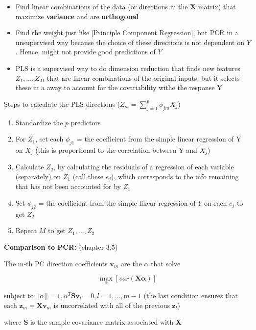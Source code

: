 \documentclass[
]{book}
\begin{document}
\begin{itemize}
\item
  Find linear combinations of the data (or directions in the \(\mathbf{X}\) matrix) that maximize \textbf{variance} and are \textbf{orthogonal}
\item
  Find the weight just like {[}Principle Component Regression{]}, but PCR in a unsupervised way because the choice of these directions is not dependent on \(Y\). Hence, might not provide good predictions of \(Y\)
\item
  PLS is a supervised way to do dimension reduction that finds new features \(Z_1, \dots, Z_M\) that are linear combinations of the original inputs, but it selects these in a away to account for the covariability withe the response Y
\end{itemize}

Steps to calculate the PLS directions (\(Z_m = \sum_{j=1}^p\phi_{jm}X_j\))

\begin{enumerate}
\def\labelenumi{\arabic{enumi}.}
\item
  Standardize the \(p\) predictors
\item
  For \(Z_1\), set each \(\phi_{j1}\) = the coefficient from the simple linear regression of Y on \(X_j\) (this is proportional to the correlation between Y and \(X_j\))
\item
  Calculate \(Z_2\), by calculating the residuals of a regression of each variable (separately) on \(Z_1\) (call these \(e_j\)), which corresponds to the info remaining that has not been accounted for by \(Z_1\)
\item
  Set \(\phi_{j2}\) = the coefficient from the simple linear regression of \(Y\) on each \(e_j\) to get \(Z_2\)
\item
  Repeat \(M\) to get \(Z_1, \dots, Z_2\)
\end{enumerate}

\textbf{Comparison to PCR:} \citet{hastie2001a} (chapter 3.5)

The m-th PC direction coefficients \(\mathbf{v}_m\) are the \(\alpha\) that solve

\[
\max_\alpha[var(\mathbf{X\alpha})]
\]

subject to \(||\alpha||=1, \alpha^T \mathbf{Sv}_l = 0, l = 1,\dots, m-1\) (the last condition ensures that each \(\mathbf{z}_m = \mathbf{Xv}_m\) is uncorrelated with all of the previous \(\mathbf{z}_l\))

where \(\mathbf{S}\) is the sample covariance matrix associated with \(\mathbf{X}\)
\end{document}
